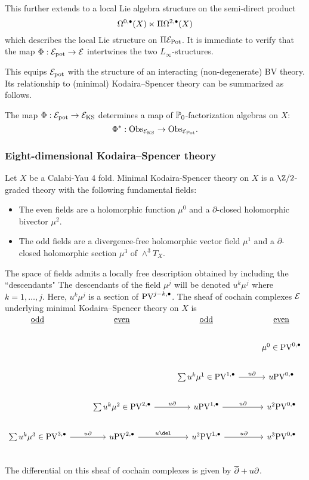 \documentclass[11pt]{amsart}
\def\PV{{\rm PV}}
\begin{document}
This further extends to a local Lie algebra structure on the semi-direct product
\[
\Omega^{0,\bullet}(X) \ltimes \Pi \Omega^{2,\bullet}(X)
\]
which describes the local Lie structure on $\Pi \mathcal E_{\rm Pot}$.
It is immediate to verify that the map $\Phi : \mathcal E_{\rm pot} \to \mathcal E$ intertwines the two $L_\infty$-structures.

This equips $\mathcal E_{\rm pot}$ with the structure of an interacting (non-degenerate) BV theory.
Its relationship to (minimal) Kodaira--Spencer theory can be summarized as follows.

\begin{prop}
The map $\Phi : \mathcal E_{\rm pot} \to \mathcal E_{\rm KS}$ determines a map of $\mathbb P_0$-factorization algebras on $X$:
\[
\Phi^* : {\rm Obs}_{\mathcal E_{\rm KS}} \to {\rm Obs}_{\mathcal E_{\rm Pot}} .
\]
\end{prop}

\subsubsection{Eight-dimensional Kodaira--Spencer theory}
\label{sec:orgeb2dd4d}

Let \(X\) be a Calabi-Yau 4 fold. Minimal Kodaira-Spencer theory on $X$ is a $\Z/2$-graded theory with the following fundamental fields:
\begin{itemize}
\item The even fields are a holomorphic function $\mu^0$ and a $\partial$-closed holomorphic bivector $\mu^2$.
\item The odd fields are a divergence-free holomorphic vector field $\mu^1$ and a $\partial$-closed holomorphic section $\mu^3$ of $\wedge^3 T_X$.
\end{itemize}

The space of fields admits a locally free description obtained by including the ``descendants" 
The descendants of the field $\mu^j$ will be denoted $u^k \mu^j$ where $k = 1,\ldots, j$.
Here, $u^k \mu^j$ is a section of $\PV^{j - k, \bu}$.
The sheaf of cochain complexes $\mathcal E$ underlying minimal Kodaira--Spencer theory on $X$ is
\[
\begin{tikzcd}
\ul{\rm odd} & \ul{\rm even} & \ul{\rm odd} & \ul{\rm even} \\
& & & \mu^0 \in \PV^{0,\bu} \\
& & \sum u^k \mu^1 \in \PV^{1,\bu} \ar[r, "u \partial"] & u \PV^{0,\bu} \\
& \sum u^k \mu^2 \in  \PV^{2,\bu} \ar[r,"u \partial"] & u \PV^{1,\bu} \ar[r, "u \partial"] & u^2 \PV^{0,\bu} \\
\sum u^k \mu^3 \in \PV^{3,\bu} \ar[r, "u \partial"]& u \PV^{2,\bu} \ar[r,"u \del"] & u^2 \PV^{1,\bu} \ar[r, "u \partial"] & u^3\PV^{0,\bu} \\
\end{tikzcd}
\]
The differential on this sheaf of cochain complexes is given by $\overline{\partial} + u \partial$.
\end{document}
